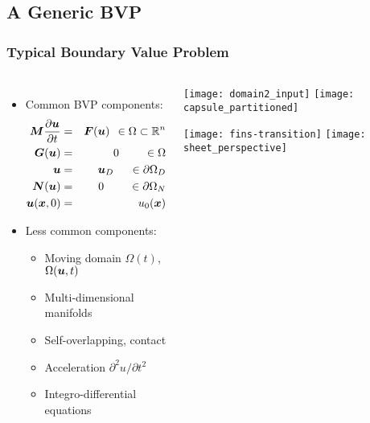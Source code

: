 \subsection*{A Generic BVP}

\begin{frame}[t]
  \frametitle{Typical Boundary Value Problem}
  \begin{columns}[t]
     \begin{itemize}
      \item Common BVP components:
      \vspace{-.1in}
        \begin{eqnarray}
        \label{eqn:general_pde}
        \nonumber
        {\boldsymbol{M}} \frac{\partial {\boldsymbol{u}}}{\partial t} & = & {\boldsymbol{F}}( {\boldsymbol{u}} ) \;\, \in \Omega \subset \mathbb{R}^n
        \\
        \nonumber
        {\boldsymbol{G}}( {\boldsymbol{u}} ) & = & 0 \;\;\;\;\;\;\;\; \in \Omega
        \\
        \nonumber
        {\boldsymbol{u}} & = & {\boldsymbol{u}}_D \;\;\;\;\; \in \partial \Omega_D
        \\
        \nonumber
        {\boldsymbol{N}}({\boldsymbol{u}}) & = & 0 \;\;\;\;\;\;\;\; \in \partial \Omega_N
        \\
        \nonumber
        {\boldsymbol{u}}({\boldsymbol{x}}, 0) & = & u_0({\boldsymbol{x}}) 
      \end{eqnarray}
      \item Less common components:
        \begin{itemize}
        \item Moving domain $\Omega(t)$, $\Omega({\boldsymbol{u}},t)$
        \item Multi-dimensional manifolds
        \item Self-overlapping, contact
        \item Acceleration ${\partial^2 u}/{\partial t^2}$
        \item Integro-differential equations
        \end{itemize}
      \end{itemize}
      \begin{center}
        \texttt{[image: domain2\_input]}
        \texttt{[image: capsule\_partitioned]}

        \texttt{[image: fins-transition]} \;
        \texttt{[image: sheet\_perspective]}

      \end{center}
  \end{columns}
\end{frame}

